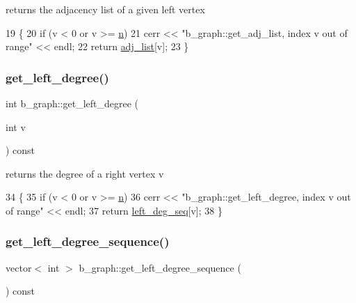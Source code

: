 returns the adjacency list of a given left vertex 


\begin{DoxyCode}
19 \{
20   \textcolor{keywordflow}{if} (v < 0 or v >= \hyperlink{classb__graph_a9e211d40c1799bc9b125de472ff06642}{n})
21     cerr << \textcolor{stringliteral}{"b\_graph::get\_adj\_list, index v out of range"} << endl;
22   \textcolor{keywordflow}{return} \hyperlink{classb__graph_a2a89d2e8f958270952aab2e8769b7342}{adj\_list}[v];
23 \}
\end{DoxyCode}
\mbox{\label{classb__graph_ac64ac5cb1197d8008e07babc333eb3ea}} 
\subsubsection{\texorpdfstring{get\+\_\+left\+\_\+degree()}{get\_left\_degree()}}
{\footnotesize\ttfamily int b\+\_\+graph\+::get\+\_\+left\+\_\+degree (\begin{DoxyParamCaption}\item[{int}]{v }\end{DoxyParamCaption}) const}



returns the degree of a right vertex v 


\begin{DoxyCode}
34 \{
35   \textcolor{keywordflow}{if} (v < 0 or v >= \hyperlink{classb__graph_a9e211d40c1799bc9b125de472ff06642}{n})
36     cerr << \textcolor{stringliteral}{"b\_graph::get\_left\_degree, index v out of range"} << endl;
37   \textcolor{keywordflow}{return} \hyperlink{classb__graph_a311d16462dbb10c47b3a6c80a42139d9}{left\_deg\_seq}[v];
38 \}
\end{DoxyCode}
\mbox{\label{classb__graph_afd65fb655f7e24217393a10533b87d3c}} 
\subsubsection{\texorpdfstring{get\+\_\+left\+\_\+degree\+\_\+sequence()}{get\_left\_degree\_sequence()}}
{\footnotesize\ttfamily vector$<$ int $>$ b\+\_\+graph\+::get\+\_\+left\+\_\+degree\+\_\+sequence (\begin{DoxyParamCaption}{ }\end{DoxyParamCaption}) const}



